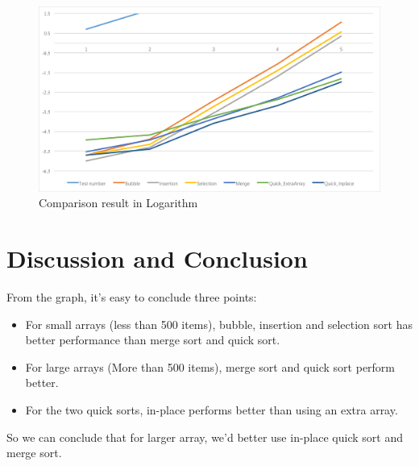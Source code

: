 \documentclass{article}
\begin{document}
\begin{figure}[t]
\centering
\includegraphics[width=\textwidth]{pic1.png}
\caption{Comparison result in Logarithm}
\end{figure}
\newpage
\section{Discussion and Conclusion}
From the graph, it's easy to conclude three points:
\begin{itemize}
\item For small arrays (less than 500 items), bubble, insertion and selection sort has better performance than merge sort and quick sort.
\item For large arrays (More than 500 items), merge sort and quick sort perform better.
\item For the two quick sorts, in-place performs better than using an extra array.
\end{itemize}
So we can conclude that for larger array, we'd better use in-place quick sort and merge sort. 
\end{document}
